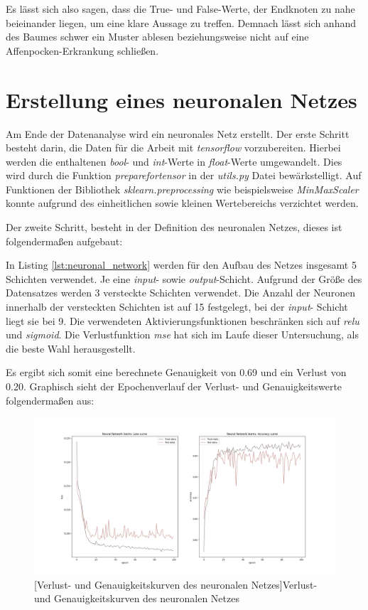 \documentclass[13pt,a4paper, listof=entryprefix, bibliography=totocnumbered,toc=listofnumbered,lof=listofnumbered]{scrartcl}
\begin{document}
Es lässt sich also sagen, dass die True- und False-Werte, der Endknoten zu nahe beieinander liegen, um eine klare Aussage zu treffen. 
Demnach lässt sich anhand des Baumes schwer ein Muster ablesen beziehungsweise nicht auf eine Affenpocken-Erkrankung schließen.  

	\section{Erstellung eines neuronalen Netzes}
		\label{ch:neuronlaes_netz}

Am Ende der Datenanalyse wird ein neuronales Netz erstellt. Der erste Schritt besteht darin, die Daten für die Arbeit mit 
\textit{tensorflow} vorzubereiten. Hierbei werden die enthaltenen \textit{bool}- und \textit{int}-Werte in 
\textit{float}-Werte umgewandelt. Dies wird durch die Funktion \textit{prepare\textunderscore for\textunderscore tensor}
in der \textit{utils.py} Datei bewärkstelligt. Auf Funktionen der Bibliothek \textit{sklearn.preprocessing} wie 
beispielsweise \textit{MinMaxScaler} konnte aufgrund des einheitlichen sowie kleinen Wertebereichs verzichtet werden. 

Der zweite Schritt, besteht in der Definition des neuronalen Netzes, dieses ist folgendermaßen aufgebaut:



In Listing \ref{lst:neuronal_network} werden für den Aufbau des Netzes insgesamt 5
Schichten verwendet. Je eine \textit{input}- sowie \textit{output}-Schicht. Aufgrund der 
Größe des Datensatzes werden 3 versteckte Schichten verwendet.
Die Anzahl der Neuronen innerhalb der versteckten Schichten ist auf 15 festgelegt, bei der \textit{input}-
Schicht liegt sie bei 9. Die verwendeten Aktivierungsfunktionen beschränken sich auf \textit{relu} und 
\textit{sigmoid}. Die Verlustfunktion \textit{mse} hat sich im Laufe dieser Untersuchung, als die beste Wahl herausgestellt.

Es ergibt sich somit eine berechnete Genauigkeit von 0.69 und ein Verlust von 0.20. Graphisch sieht der Epochenverlauf der Verlust- und 
Genauigkeitswerte folgendermaßen aus: 

	\begin{figure}[H]
		\centering
		\includegraphics[width=0.8\linewidth]{Bilder/neural_network.png}
		[Verlust- und Genauigkeitskurven des neuronalen Netzes]{Verlust- und Genauigkeitskurven des neuronalen Netzes}
		\label{fig:neural_network}
	\end{figure}
\end{document}
